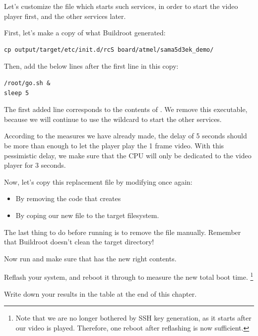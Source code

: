Let's customize the  file which starts such
services, in order to start the video player first, and the other services
later.

First, let's make a copy of what Buildroot generated:

\begin{verbatim}
cp output/target/etc/init.d/rcS board/atmel/sama5d3ek_demo/
\end{verbatim}

Then, add the below lines after the first line in this copy:

\begin{verbatim}
/root/go.sh &
sleep 5
\end{verbatim}

The first added line corresponds to the contents of
. We remove this executable, because
we will continue to use the  wildcard to start the
other services.

According to the measures we have already made, the delay of 5 seconds
should be more than enough to let the player play the 1 frame video.
With this pessimistic delay, we make sure that the CPU will only be
dedicated to the video player for 3 seconds.

Now, let's copy this replacement  file by
modifying  once again:

\begin{itemize}
\item By removing the code that creates 
\item By coping our new  file to the target filesystem.
\end{itemize}

The last thing to do before running  is to remove the
 file manually. Remember that
Buildroot doesn't clean the target directory!

Now run  and make sure that
 has the new right contents. 

Reflash your system, and reboot it through  to 
measure the new total boot time.
\footnote{Note that we are no longer bothered by SSH key generation,
as it starts after our video is played. Therefore, one reboot
after reflashing is now sufficient.}

Write down your results in the table at the end of this chapter.

